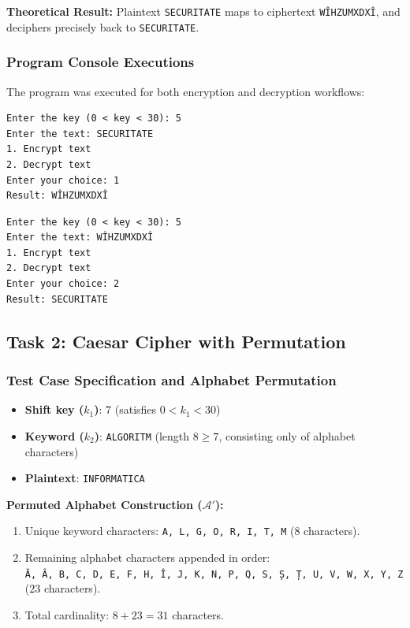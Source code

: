 \documentclass[12pt,a4paper]{article}
\begin{document}
\noindent
\textbf{Theoretical Result:} Plaintext \texttt{SECURITATE} maps to ciphertext \texttt{WÎHZUMXDXÎ}, and deciphers precisely back to \texttt{SECURITATE}.

\subsubsection{Program Console Executions}
The program was executed for both encryption and decryption workflows:

\begin{lstlisting}[caption={Task 1 Encryption Execution}]
Enter the key (0 < key < 30): 5
Enter the text: SECURITATE
1. Encrypt text
2. Decrypt text
Enter your choice: 1
Result: WÎHZUMXDXÎ
\end{lstlisting}

\begin{lstlisting}[caption={Task 1 Decryption Execution}]
Enter the key (0 < key < 30): 5
Enter the text: WÎHZUMXDXÎ
1. Encrypt text
2. Decrypt text
Enter your choice: 2
Result: SECURITATE
\end{lstlisting}

\subsection{Task 2: Caesar Cipher with Permutation}

\subsubsection{Test Case Specification and Alphabet Permutation}
\begin{itemize}
    \item \textbf{Shift key ($k_1$)}: $7$ (satisfies $0 < k_1 < 30$)
    \item \textbf{Keyword ($k_2$)}: \texttt{ALGORITM} (length $8 \ge 7$, consisting only of alphabet characters)
    \item \textbf{Plaintext}: \texttt{INFORMATICA}
\end{itemize}

\noindent
\textbf{Permuted Alphabet Construction ($\mathcal{A}'$):}
\begin{enumerate}
    \item Unique keyword characters: \texttt{A, L, G, O, R, I, T, M} ($8$ characters).
    \item Remaining alphabet characters appended in order: \\
    \texttt{Ă, Â, B, C, D, E, F, H, Î, J, K, N, P, Q, S, Ș, Ț, U, V, W, X, Y, Z} ($23$ characters).
    \item Total cardinality: $8 + 23 = 31$ characters.
\end{enumerate}
\end{document}
